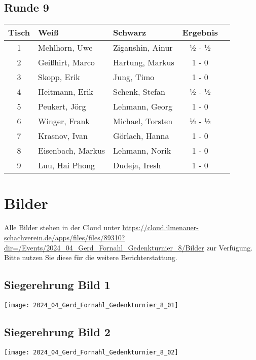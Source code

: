 \documentclass[a4paper,ngerman]{tui-algo-seminar}
\begin{document}
\subsection{Runde 9}
\begin{center}
\begin{tabular}{cllcl}
\toprule
\textbf{Tisch} & \textbf{Weiß} & \textbf{Schwarz} & \textbf{Ergebnis} \\
\midrule
1 & Mehlhorn, Uwe & Ziganshin, Ainur & ½ - ½ \\
2 & Geißhirt, Marco & Hartung, Markus & 1 - 0 \\
3 & Skopp, Erik & Jung, Timo & 1 - 0 \\
4 & Heitmann, Erik & Schenk, Stefan & ½ - ½ \\
5 & Peukert, Jörg & Lehmann, Georg & 1 - 0 \\
6 & Winger, Frank & Michael, Torsten & ½ - ½ \\
7 & Krasnov, Ivan & Görlach, Hanna & 1 - 0 \\
8 & Eisenbach, Markus & Lehmann, Norik & 1 - 0 \\
9 & Luu, Hai Phong & Dudeja, Iresh & 1 - 0 \\
\bottomrule
\end{tabular}
\end{center}



\section{Bilder}
Alle Bilder stehen in der Cloud unter \url{https://cloud.ilmenauer-schachverein.de/apps/files/files/89310?dir=/Events/2024_04_Gerd_Fornahl_Gedenkturnier_8/Bilder} zur Verfügung. Bitte nutzen Sie diese für die weitere Berichterstattung.

\subsection{Siegerehrung Bild 1}
\begin{center}
    \texttt{[image: 2024\_04\_Gerd\_Fornahl\_Gedenkturnier\_8\_01]}
    \label{fig:gerd_fornahl_1}
\end{center}

\subsection{Siegerehrung Bild 2}
\begin{center}
    \texttt{[image: 2024\_04\_Gerd\_Fornahl\_Gedenkturnier\_8\_02]}
    \label{fig:gerd_fornahl_2}
\end{center}
\end{document}
